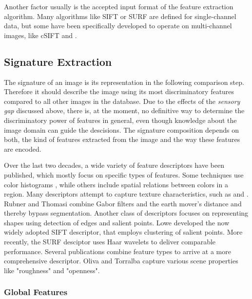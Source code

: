 Another factor usually is the accepted input format of the feature extraction
algorithm. Many algorithms like SIFT \autocite{lowe_object_1999} or SURF
\autocite{bay_speeded-up_2008} are defined for single-channel data, but some
have been specifically developed to operate on multi-channel images, like cSIFT
\autocite{abdel-hakim_csift:_2006} and \autocite{yang_robust_2008}.

\subsection{Signature Extraction}\label{sec:anatomy_signature_extraction}

The signature of an image is its representation in the following comparison
step. Therefore it should describe the image using its most discriminatory
features compared to all other images in the database. Due to the effects of
the \emph{sensory gap} discussed above, there is, at the moment, no definitive
way to determine the discriminatory power of features in general, even though
knowledge about the image domain can guide the descisions.  The signature
composition depends on both, the kind of features extracted from the image and
the way these features are encoded. 

Over the last two decades, a wide variety of feature descriptors have been
published, which mostly focus on specific types of features. Some techniques
use color histograms \autocite{utenpattanant_color_2006}, while others
\autocite{stricker_color_1996} \autocite{deng_efficient_2001}
\autocite{lee_spatial_2003} include spatial relations between colors in a
region.
Many descriptors attempt to capture texture characteristics, such as
\autocite{schaffalitzky_viewpoint_2001} and \autocite{manjunath_texture_1996}.
Rubner and Thomasi \autocite{rubner_texture-based_1999} combine Gabor filters
and the earth mover's distance and thereby bypass segmentation.
Another class of descriptors focuses on representing shapes using detection of
edges and salient points. Lowe \autocite{lowe_object_1999} developed the now
widely adopted SIFT descriptor, that employs clustering of salient points. More
recently, the SURF desciptor \autocite{bay_speeded-up_2008} uses Haar wavelets
to deliver comparable performance.
Several publications combine feature types to arrive at a more comprehensive
descriptor. Oliva and Torralba \autocite{oliva_modeling_2001} capture various
scene properties like "roughness" and "openness".

\subsubsection{Global Features}

